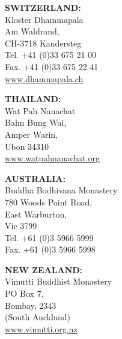 {\begin{minipage}{0.95\linewidth}
\begin{multicols}{2}
{%
%

}

\columnbreak

{\raggedright

\textbf{SWITZERLAND:} \\
Kloster Dhammapala\\
Am Waldrand,\\
CH-3718 Kandersteg\\
Tel. +41 (0)33 675 21 00\\
Fax. +41 (0)33 675 22 41\\
\href{http://www.dhammapala.ch}{www.dhammapala.ch}

\vfill

\textbf{THAILAND:} \\
Wat Pah Nanachat\\
Bahn Bung Wai,\\
Amper Warin,\\
Ubon 34310\\
\href{http://www.watpahnanachat.org}{www.watpahnanachat.org}

\vfill

\textbf{AUSTRALIA:} \\
Buddha Bodhivana Monastery\\
780 Woods Point Road,\\
East Warburton,\\
Vic 3799\\
Tel. +61 (0)3 5966 5999\\
Fax. +61 (0)3 5966 5998

\vfill

\textbf{NEW ZEALAND:} \\
Vimutti Buddhist Monastery\\
PO Box 7,\\
Bombay, 2343\\
(South Auckland)\\
\href{http://www.vimutti.org.nz}{www.vimutti.org.nz}

%

}
\end{multicols}
\end{minipage}}
